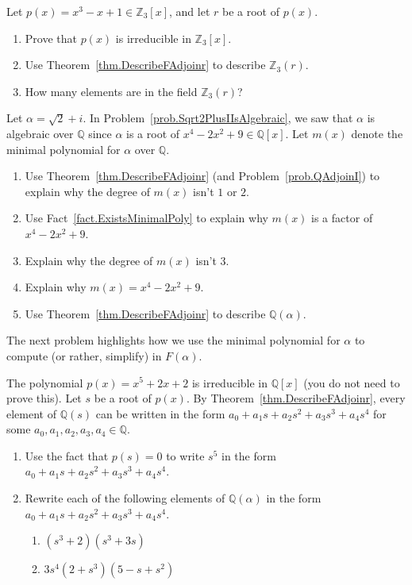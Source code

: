 \begin{problem}\label{prob.Degree3ExtOfF3}
Let $p(x) = x^3-x+1 \in \mathbb{Z}_3[x]$, and let $r$ be a root of $p(x)$. 
\begin{enumerate}
\item Prove that $p(x)$ is irreducible in $\mathbb{Z}_3[x]$. 
\item Use Theorem~\ref{thm.DescribeFAdjoinr} to describe $\mathbb{Z}_3(r)$.
\item How many elements are in the field $\mathbb{Z}_3(r)$?
\end{enumerate}
\end{problem}

\begin{problem}\label{prob.DescribeQAdjoinSqrt2PlusI}
Let $\alpha = \sqrt{2} + i$. In Problem~\ref{prob.Sqrt2PlusIIsAlgebraic}, we saw that $\alpha$ is algebraic over $\mathbb{Q}$ since $\alpha$ is a root of  $x^4-2x^2+9\in \mathbb{Q}[x]$. Let $m(x)$ denote the minimal polynomial for $\alpha$ over $\mathbb{Q}$.
\begin{enumerate}
\item Use Theorem~\ref{thm.DescribeFAdjoinr} (and Problem~\ref{prob.QAdjoinI}) to explain why the degree of $m(x)$ isn't $1$ or $2$.
\item Use Fact~\ref{fact.ExistsMinimalPoly} to explain why $m(x)$ is a factor of $x^4-2x^2+9$.
\item Explain why the degree of $m(x)$ isn't $3$.
\item Explain why  $m(x)=x^4-2x^2+9$.
\item Use Theorem~\ref{thm.DescribeFAdjoinr} to describe $\mathbb{Q}(\alpha)$.
\end{enumerate}
\end{problem}

The next problem highlights how we use the minimal polynomial for $\alpha$ to compute (or rather, simplify) in  $F(\alpha)$.

\begin{problem}\label{prob.DescribeQRootx52x2}
The polynomial $p(x) = x^5 + 2x + 2$ is irreducible in $\mathbb{Q}[x]$ (you do not need to prove this). Let $s$ be a root of $p(x)$. By Theorem~\ref{thm.DescribeFAdjoinr}, every element of $\mathbb{Q}(s)$ can be written in the form $a_0 + a_1s + a_2s^2 + a_3s^3 + a_4s^4$ for some $a_0,a_1,a_2,a_3,a_4 \in \mathbb{Q}$.
\begin{enumerate}
\item Use the fact that $p(s) = 0$ to write $s^5$ in the form  $a_0 + a_1s + a_2s^2 + a_3s^3 + a_4s^4$.
\item Rewrite each of the following elements of $\mathbb{Q}(\alpha)$ in the form  $a_0 + a_1s + a_2s^2 + a_3s^3 + a_4s^4$.
\begin{enumerate}
\item $(s^3+2)(s^3+3s)$
\item $3s^4(2+s^3)(5-s+s^2)$
\end{enumerate}
\end{enumerate}
\end{problem}


